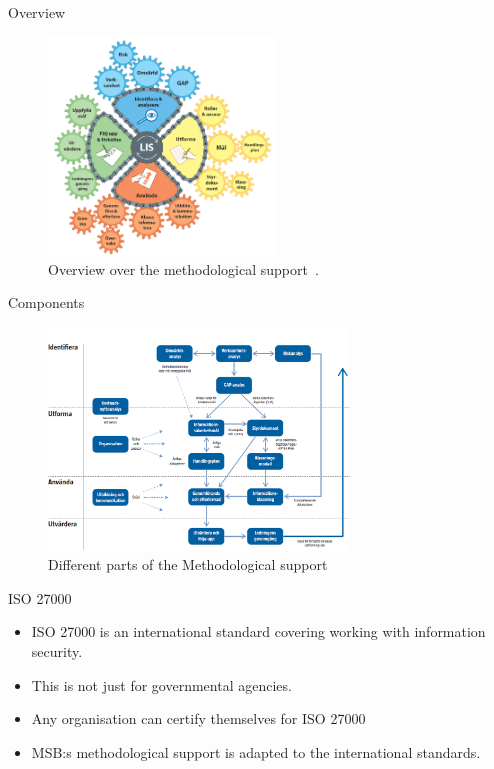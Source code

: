 \documentclass{beamer}
\begin{document}
\begin{frame}{Overview}{\insertsectionhead}
  \begin{figure}
    \includegraphics[width=6cm]{Figures/kugghjulet_lis.png}
    \caption{Overview over the methodological support~\cite{msb_metodstod}.}
  \end{figure}
\end{frame}

\begin{frame}{Components}{\insertsectionhead}
  \begin{figure}
    \includegraphics[width=8cm]{Figures/oversiktsbild-over-metodstegens-olika-delar-och-hur-de-relaterar-till-varandra.png}
    \caption{Different parts of the Methodological support~\cite{msb_metodstod}}
  \end{figure}
\end{frame}

\begin{frame}{ISO 27000}{\insertsectionhead}
  \begin{itemize}
    \item ISO 27000 is an international standard covering working with
      information security.
    \item This is not just for governmental agencies.
    \item Any organisation can certify themselves for ISO 27000
    \item MSB:s methodological support is adapted to the international
      standards.
  \end{itemize}
\end{frame}
\end{document}
